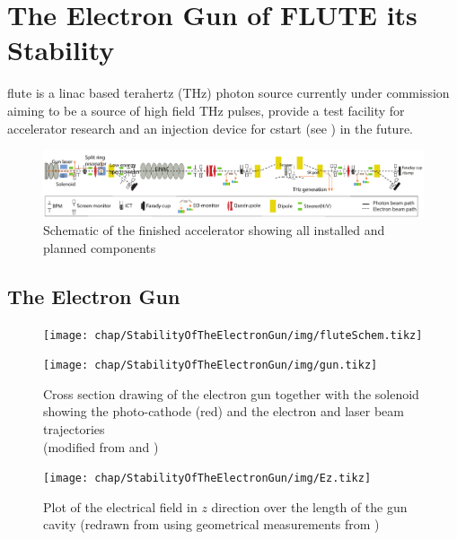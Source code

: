 \chapter{The Electron Gun of FLUTE its Stability}
\Gls{flute} is a \gls{linac} based terahertz (THz) photon source currently under commission aiming to be a source of high field THz pulses, provide a test facility for accelerator research and an injection device for \gls{cstart} (see \cite{SchaeferHaererPapash2019_1000091183}) in the future. \cite{Naknaimueang:2011zz}

\begin{figure}[tb]
	\centering
	\includegraphics[width=\textwidth]{chap/StabilityOfTheElectronGun/img/flutePaper.png}
	\caption{Schematic of the finished accelerator showing all installed and planned components \cite{Yan2018}}
	\label{fig:fluteEgun-flutePaper}
\end{figure}


\section{The Electron Gun}

\begin{figure}[tb]
	\centering
	\texttt{[image: chap/StabilityOfTheElectronGun/img/fluteSchem.tikz]}
	\caption{}
	\label{fig:fluteEgun-rfschematic}
\end{figure}

\begin{figure}[tb]
	\centering
	\texttt{[image: chap/StabilityOfTheElectronGun/img/gun.tikz]}
	\caption{Cross section drawing of the electron gun together with the solenoid showing the photo-cathode (red) and the electron and laser beam trajectories
	\\(modified from \cite{Bossart:clic} and \cite{Bossart:288412})}
	\label{fig:fluteEgun-gunDraw}
\end{figure}

\begin{figure}[tb]
	\centering
	\texttt{[image: chap/StabilityOfTheElectronGun/img/Ez.tikz]}
	\caption{Plot of the electrical field in $z$ direction over the length of the gun cavity (redrawn from \cite{Bossart:clic} using geometrical measurements from \cite{Hoeninger2014})}
	\label{fig:fluteEgun-Ezplot}
\end{figure}

